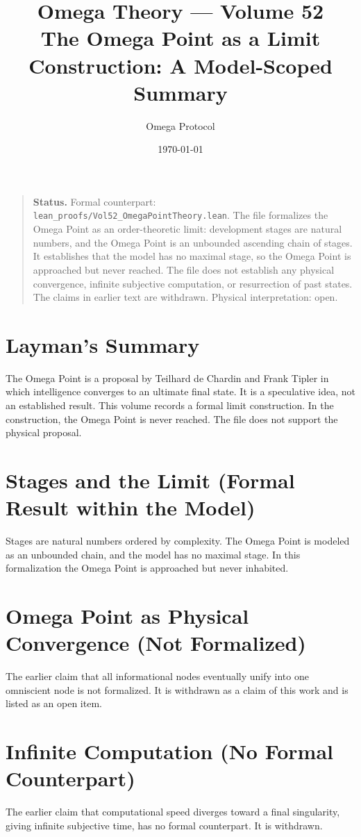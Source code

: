 \documentclass[11pt, a4paper]{article}
\title{Omega Theory --- Volume 52\\\Large The Omega Point as a Limit Construction: A Model-Scoped Summary}
\author{Omega Protocol}
\date{\today}
\begin{document}
\maketitle

\begin{quote}
\textbf{Status.} Formal counterpart: \texttt{lean\_proofs/Vol52\_OmegaPointTheory.lean}. The file formalizes the Omega Point as an order-theoretic limit: development stages are natural numbers, and the Omega Point is an unbounded ascending chain of stages. It establishes that the model has no maximal stage, so the Omega Point is approached but never reached. The file does not establish any physical convergence, infinite subjective computation, or resurrection of past states. The claims in earlier text are withdrawn. Physical interpretation: open.
\end{quote}

\section*{Layman's Summary}
The Omega Point is a proposal by Teilhard de Chardin and Frank Tipler in which intelligence converges to an ultimate final state. It is a speculative idea, not an established result. This volume records a formal limit construction. In the construction, the Omega Point is never reached. The file does not support the physical proposal.

\section{Stages and the Limit (Formal Result within the Model)}
Stages are natural numbers ordered by complexity. The Omega Point is modeled as an unbounded chain, and the model has no maximal stage. In this formalization the Omega Point is approached but never inhabited.

\section{Omega Point as Physical Convergence (Not Formalized)}
The earlier claim that all informational nodes eventually unify into one omniscient node is not formalized. It is withdrawn as a claim of this work and is listed as an open item.

\section{Infinite Computation (No Formal Counterpart)}
The earlier claim that computational speed diverges toward a final singularity, giving infinite subjective time, has no formal counterpart. It is withdrawn.
\end{document}

